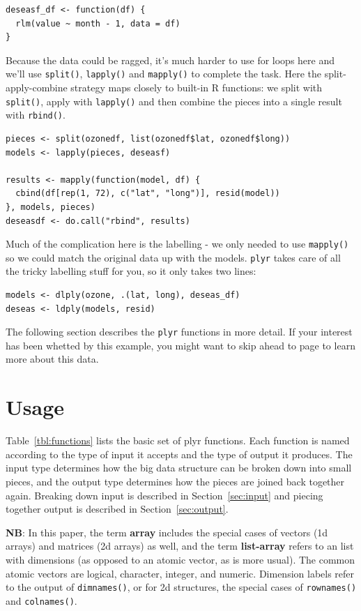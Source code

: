\documentclass{scrartcl}
\newcommand{\f}[1]{\lstinline!#1()!}
\newcommand{\plyr}{{\tt plyr}\xspace}
\begin{document}
\begin{verbatim}
deseasf_df <- function(df) {
  rlm(value ~ month - 1, data = df)
}
\end{verbatim}

Because the data could be ragged, it's much harder to use for loops here and  we'll use \f{split}, \f{lapply} and \f{mapply} to complete the task.  Here the split-apply-combine strategy maps closely to built-in R functions: we split with \f{split}, apply with \f{lapply} and then combine the pieces into a single result with \f{rbind}.

\begin{verbatim}
pieces <- split(ozonedf, list(ozonedf$lat, ozonedf$long))
models <- lapply(pieces, deseasf)

results <- mapply(function(model, df) {
  cbind(df[rep(1, 72), c("lat", "long")], resid(model))
}, models, pieces)
deseasdf <- do.call("rbind", results)
\end{verbatim}

Much of the complication here is the labelling - we only needed to use \f{mapply} so we could match the original data up with the models. \plyr takes care of all the tricky labelling stuff for you, so it only takes two lines:

\begin{verbatim}
models <- dlply(ozone, .(lat, long), deseas_df)
deseas <- ldply(models, resid)
\end{verbatim}

The following section describes the \plyr functions in more detail.  If your interest has been whetted by this example, you might want to skip ahead to page \pageref{sub:ozone} to learn more about this data.

\section{Usage}
\label{sec:usage}

Table~\ref{tbl:functions} lists the basic set of plyr functions.  Each function is named according to the type of input it accepts and the type of output it produces.  The input type determines how the big data structure can be broken down into small pieces, and the output type determines how the pieces are joined back together again.  Breaking down input is described in Section~\ref{sec:input} and piecing together output is described in Section~\ref{sec:output}.

{\bf NB}: In this paper, the term {\bf array} includes the special cases of vectors (1d arrays) and matrices (2d arrays) as well, and the term {\bf list-array} refers to an list with dimensions (as opposed to an atomic vector, as is more usual).  The common atomic vectors are logical, character, integer, and numeric.  Dimension labels refer to the output of \f{dimnames}, or for 2d structures, the special cases of \f{rownames} and \f{colnames}.
\end{document}
